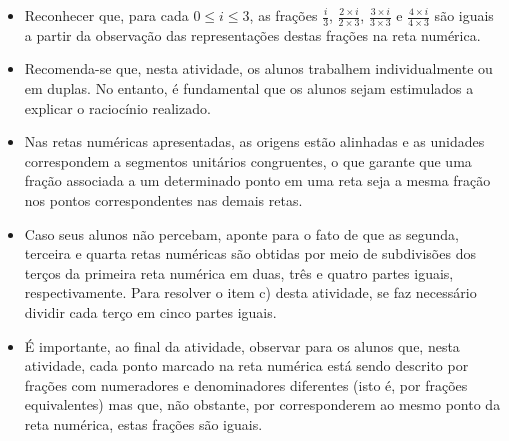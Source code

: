 \begin{multicols}{2}
\Bg

\begin{objetivos}[label=chap4-ativ7]{}{}
\begin{itemize} %
    \item       Reconhecer que, para cada       $0 \leq i \leq 3$, as frações
   $\frac{i}{3}$,       $\frac{2 \times i}{2 \times 3 }$,       $\frac{3 \times
i}{3 \times 3}$       e       $\frac{4 \times i}{4 \times 3}$       são iguais a
partir da observação das representações destas frações na reta numérica.
\end{itemize} %
\end{objetivos}

\begin{orientacoes}{}{}

\begin{itemize} %
    \item       Recomenda-se que, nesta atividade, os alunos trabalhem
individualmente ou em duplas. No entanto, é fundamental que os alunos sejam
estimulados a explicar o raciocínio realizado.
    \item       Nas retas numéricas apresentadas, as origens estão alinhadas e
as unidades correspondem a segmentos unitários congruentes, o que garante que
uma fração associada a um determinado ponto em uma reta seja a mesma fração nos
pontos correspondentes nas demais retas.
    \item       Caso seus alunos não percebam, aponte para o fato de que as
segunda, terceira e quarta retas numéricas são obtidas por meio de subdivisões
dos terços da primeira reta numérica em duas, três e quatro partes iguais,
respectivamente. Para resolver o item c) desta atividade, se faz necessário
dividir cada terço em cinco partes iguais.
    \item       É importante, ao final da atividade, observar para os alunos
que, nesta atividade, cada ponto marcado na reta numérica está sendo descrito
por frações com numeradores e denominadores diferentes (isto é, por frações
equivalentes) mas que, não obstante, por corresponderem ao mesmo ponto da reta
numérica, estas frações são iguais.
\end{itemize} %







\end{orientacoes}
\end{multicols}
